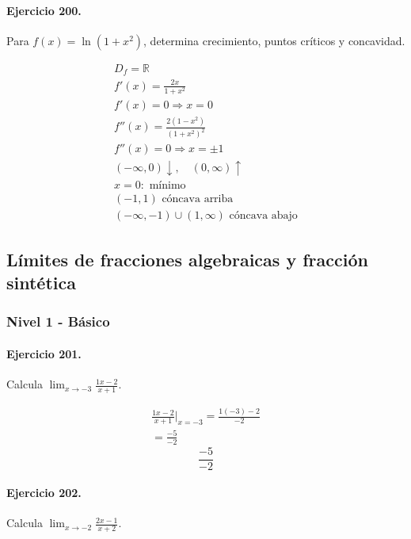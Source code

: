 \documentclass[11pt,a4paper]{article}
\begin{document}
\paragraph{Ejercicio 200.} Para $f(x)=\ln(1+x^2)$, determina crecimiento, puntos críticos y concavidad.

\[
\begin{aligned}
D_f=\mathbb{R}\\
f'(x)=\frac{2x}{1+x^2}\\
f'(x)=0\Rightarrow x=0\\
f''(x)=\frac{2(1-x^2)}{(1+x^2)^2}\\
f''(x)=0\Rightarrow x=\pm1\\
(-\infty,0)\downarrow,\quad(0,\infty)\uparrow\\
x=0:\text{{ mínimo}}\\
(-1,1)\text{{ cóncava arriba}}\\
(-\infty,-1)\cup(1,\infty)\text{{ cóncava abajo}}
\end{aligned}
\]


\newpage

\subsection*{Límites de fracciones algebraicas y fracción sintética}


\subsubsection*{Nivel 1 - Básico}

\paragraph{Ejercicio 201.} Calcula $\displaystyle\lim_{x\to -3}\frac{1x-2}{x+1}$. 

\[
\begin{aligned}
\frac{1x-2}{x+1}\Big|_{x=-3}=\frac{1(-3)-2}{-2}\\
=\frac{-5}{-2}
\end{aligned}
\]
\[\boxed{\frac{-5}{-2}}\]


\paragraph{Ejercicio 202.} Calcula $\displaystyle\lim_{x\to -2}\frac{2x-1}{x+2}$. 
\end{document}

